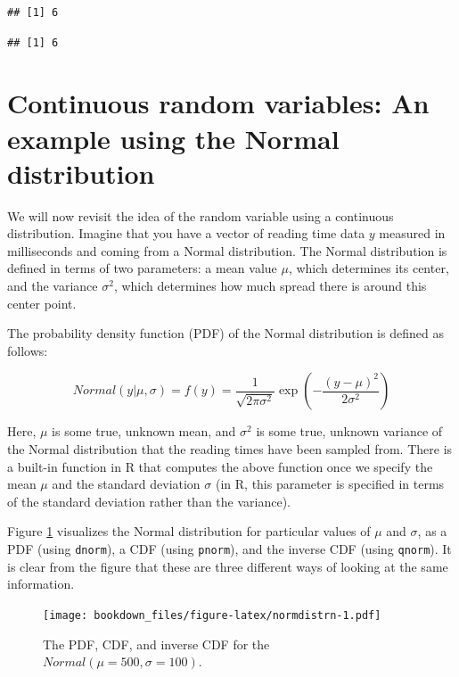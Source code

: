 \documentclass[12pt,]{krantz}
\theoremstyle{definition}
\theoremstyle{definition}
\theoremstyle{definition}
\theoremstyle{remark}
\begin{document}
\begin{verbatim}
## [1] 6
\end{verbatim}

\begin{verbatim}
## [1] 6
\end{verbatim}

\hypertarget{continuous-random-variables-an-example-using-the-normal-distribution}{%
\section{Continuous random variables: An example using the Normal distribution}\label{continuous-random-variables-an-example-using-the-normal-distribution}}

We will now revisit the idea of the random variable using a continuous distribution. Imagine that you have a vector of reading time data \(y\) measured in milliseconds and coming from a Normal distribution. The Normal distribution is defined in terms of two parameters: a mean value \(\mu\), which determines its center, and the variance \(\sigma^2\), which determines how much spread there is around this center point.

The probability density function (PDF) of the Normal distribution is defined as follows:

\begin{equation}
Normal(y|\mu,\sigma)=f(y)= \frac{1}{\sqrt{2\pi \sigma^2}} \exp \left(-\frac{(y-\mu)^2}{2\sigma^2} \right)
\end{equation}

Here, \(\mu\) is some true, unknown mean, and \(\sigma^2\) is some true, unknown variance of the Normal distribution that the reading times have been sampled from. There is a built-in function in R that computes the above function once we specify the mean \(\mu\) and the standard deviation \(\sigma\) (in R, this parameter is specified in terms of the standard deviation rather than the variance).

Figure \ref{fig:normdistrn} visualizes the Normal distribution for particular values of \(\mu\) and \(\sigma\), as a PDF (using \texttt{dnorm}), a CDF (using \texttt{pnorm}), and the inverse CDF (using \texttt{qnorm}). It is clear from the figure that these are three different ways of looking at the same information.

\begin{figure}
\centering
\texttt{[image: bookdown\_files/figure-latex/normdistrn-1.pdf]}
\caption{\label{fig:normdistrn}The PDF, CDF, and inverse CDF for the \(Normal(\mu=500,\sigma=100)\).}
\end{figure}
\end{document}
